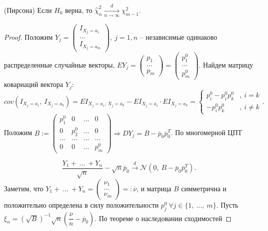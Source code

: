 \begin{theorem}
    (Пирсона) Если $\displaystyle H_{0}$ верна, то $\displaystyle \hat{\chi }_{n}^{2}\xrightarrow[n\rightarrow \infty ]{d} \chi _{m-1}^{2}$.
\end{theorem}
\begin{proof}
    Положим $\displaystyle Y_{j} =\begin{pmatrix}
    I_{X_{j} =a_{1}}\\
    \dotsc \\
    I_{X_{j} =a_{m}}
    \end{pmatrix} ,\ j=\overline{1,n}$ -- независимые одинаково распределенные случайные векторы, $\displaystyle EY_{j} =\begin{pmatrix}
    p_{1}\\
    \dotsc \\
    p_{m}
    \end{pmatrix} =\begin{pmatrix}
    p_{1}^{0}\\
    \dotsc \\
    p_{m}^{0}
    \end{pmatrix}$. Найдем матрицу ковариаций вектора $\displaystyle Y_{j}$:
    \begin{equation*}
        cov( I_{X_{j} =a_{i}} ,\ I_{X_{j} =a_{k}}) =EI_{X_{j} =a_{i} ,\ X_{j} =a_{k}} -EI_{X_{j} =a_{i}} \cdotp EI_{X_{j} =a_{k}} =\begin{cases}
        p_{i}^{0} -p_{i}^{0} p_{k}^{0} & ,\ i=k\\
        -p_{i}^{0} p_{k}^{0} & ,\ i\neq k
        \end{cases} .
    \end{equation*}
    Положим $\displaystyle B:=\begin{pmatrix}
    p_{1}^{0} & 0 & \dotsc  & 0\\
    0 & p_{2}^{0} & \dotsc  & 0\\
    \dotsc  & \dotsc  & \dotsc  & \dotsc \\
    0 & 0 & \dotsc  & p_{m}^{0}
    \end{pmatrix} \Rightarrow DY_{j} =B-\overline{p}_{0}\overline{p}_{0}^{T}$. По многомерной ЦПТ
    
    
    \begin{equation*}
        \dfrac{Y_{1} +\ \dotsc \ +Y_{n}}{\sqrt{n}} -\sqrt{n}\overline{p}_{0}\xrightarrow{d}\mathcal{N}\left( 0,\ B-\overline{p}_{0}\overline{p}_{0}^{T}\right) .
    \end{equation*}
    Заметим, что $\displaystyle Y_{1} +\ \dotsc \ +Y_{n} =\begin{pmatrix}
    \nu _{1}\\
    \dotsc \\
    \nu _{m}
    \end{pmatrix} =:\overline{\nu }$, и матрица $\displaystyle B$ симметрична и положительно определена в силу положительности $\displaystyle p_{j}^{0} \ \forall j\in \{1,\ \dotsc ,\ m\}$. Пусть $\displaystyle \xi _{n} =\left(\sqrt{B}\right)^{-1}\sqrt{n}\left(\dfrac{\overline{\nu }}{n} -\overline{p}_{0}\right)$. По теореме о наследовании сходимостей
    

\end{proof}
